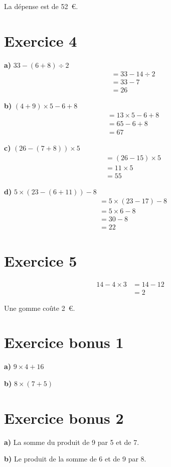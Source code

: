 \documentclass[12pt]{extarticle}
\begin{document}
La dépense est de 52~€.

\section*{Exercice 4}

\textbf{a)} $33 - (6 + 8) \div 2$
\begin{align*}
&= 33 - 14 \div 2 \\
&= 33 - 7 \\
&= 26
\end{align*}

\textbf{b)} $(4 + 9) \times 5 - 6 + 8$
\begin{align*}
&= 13 \times 5 - 6 + 8 \\
&= 65 - 6 + 8 \\
&= 67
\end{align*}

\textbf{c)} $(26 - (7 + 8)) \times 5$
\begin{align*}
&= (26 - 15) \times 5 \\
&= 11 \times 5 \\
&= 55
\end{align*}

\textbf{d)} $5 \times (23 - (6 + 11)) - 8$
\begin{align*}
&= 5 \times (23 - 17) - 8 \\
&= 5 \times 6 - 8 \\
&= 30 - 8 \\
&= 22
\end{align*}

\section*{Exercice 5}
\begin{align*}
14 - 4 \times 3 &= 14 - 12 \\
                &= 2
\end{align*}

Une gomme coûte 2~€.

\section*{Exercice bonus 1}

\textbf{a)} $9 \times 4 + 16$

\textbf{b)} $8 \times (7 + 5)$

\section*{Exercice bonus 2}

\textbf{a)} La somme du produit de 9 par 5 et de 7.

\textbf{b)} Le produit de la somme de 6 et de 9 par 8.
\end{document}
